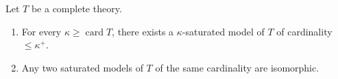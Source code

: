 Let $T$ be a complete theory.
\begin{enumerate}
\item For every $\kappa \geq \operatorname{card} T$, there exists a $\kappa$-saturated model of $T$ of cardinality $\leq \kappa^+$.
\item Any two saturated models of $T$ of the same cardinality are isomorphic.
\end{enumerate}
